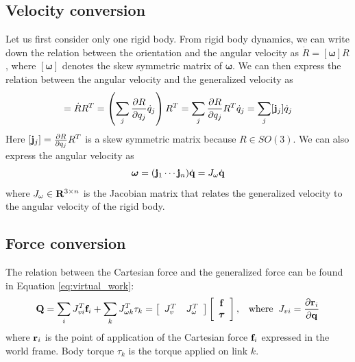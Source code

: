 \subsection{Velocity conversion}
Let us first consider only one rigid body. From rigid body dynamics,
we can write down the relation between the orientation and the angular
velocity as $\dot{R} = [\bm{\omega}] R$, where $[\boldsymbol{\bm{\omega}}]$
denotes the skew symmetric matrix of ${\bm{\omega}}$. We can
then express the relation between the angular velocity and the
generalized velocity as
\begin{equation}
[\bm{\omega}] = \dot{R} R^{T} = \left(\sum_j \frac{\partial R}{\partial q_j}
\dot{q}_j \right) R^T = \sum_j\frac{\partial R}{\partial q_j} R^T
\dot{q}_j = \sum_j [\vc{j}_j] \dot{q}_j
\end{equation}
Here $[\mathbf{j}_j] = \frac{\partial R}{\partial q_j} R^T$ is a skew
symmetric matrix because $R \in SO(3)$. We can also express the
angular velocity as
\begin{equation}
\bm{\omega} = ( \mathbf{j}_1 \cdots \mathbf{j}_n) \dot{\mathbf{q}} = J_{\omega} \dot{\mathbf{q}}
\end{equation}
where $ J_{\omega} \in \mathbf{R}^{3 \times n}$ is the Jacobian matrix
that relates the generalized velocity to the angular velocity of the
rigid body.
 

\subsection{Force conversion}
The relation between the Cartesian force and the generalized force can
be found in Equation \ref{eq:virtual_work}:
\begin{equation}
\label{eqn:force_conversion}
\mathbf{Q} = \sum_i J_{vi}^T \mathbf{f}_i + \sum_k J_{\omega k}^T \tau_k = 
\left[
\begin{array}{cc}
J_{v}^T & J_\omega^T
\end{array}
\right]
\left[
\begin{array}{c}
\mathbf{f} \\
\bm{\tau}
\end{array}
\right] 
, \;\;\;\mathrm{where}\;\;
J_{vi} = \frac{\partial \mathbf{r}_i}{\partial \mathbf{q}}
\end{equation}
where $\mathbf{r}_i$ is the point of application of the Cartesian force
$\mathbf{f}_i$ expressed in the world frame. Body torque $\tau_k$ is the torque
applied on link $k$. 

